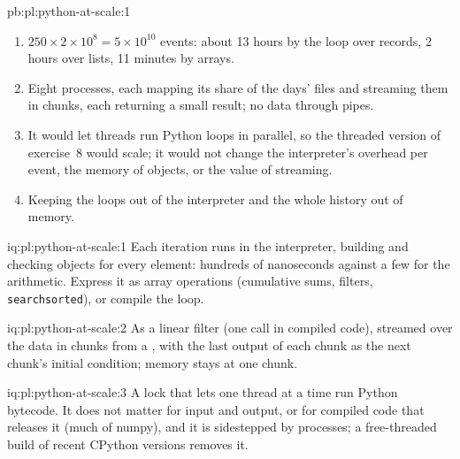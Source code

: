 \begin{solution}{pb:pl:python-at-scale:1}
\begin{enumerate}
(0.025~s against 0.028~s whole, 0.023~s at the fastest chunk of 100\,000) with a peak of 0.31~MB instead of 32~MB, so a 1.5~GB budget holds about 94 million events whole and any history streamed.
\item $250 \times 2\times10^8 = 5\times10^{10}$ events: about 13 hours by the loop over records, 2 hours over lists, 11 minutes by
arrays.
\item Eight processes, each mapping its share of the days' files and streaming them in chunks, each returning a small result; no data
through pipes.
\item It would let threads run Python loops in parallel, so the threaded version of exercise~8 would scale; it would not change the
interpreter's overhead per event, the memory of objects, or the value of streaming.
\item Keeping the loops out of the interpreter and the whole history out of memory.
\end{enumerate}
\end{solution}

\begin{solution}{iq:pl:python-at-scale:1}
Each iteration runs in the interpreter, building and checking objects for every element: hundreds of nanoseconds against a few
for the arithmetic. Express it as array operations (cumulative sums, filters, \texttt{searchsorted}), or compile the loop.
\end{solution}

\begin{solution}{iq:pl:python-at-scale:2}
As a linear filter (one call in compiled code), streamed over the data in chunks from a , with the last output of
each chunk as the next chunk's initial condition; memory stays at one chunk.
\end{solution}

\begin{solution}{iq:pl:python-at-scale:3}
A lock that lets one thread at a time run Python bytecode. It does not matter for input and output, or for compiled code that releases
it (much of numpy), and it is sidestepped by processes; a free-threaded build of recent CPython versions removes it.
\end{solution}

